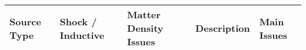 \begin{table}[H]
\begin{footnotesize}
%
%
\centering
\begin{tabular}{|p{.7in}|p{.5in}|p{.5in}|p{1.7in}|p{1.7in}|} \hline

Source Type & Shock / Inductive & Matter Density Issues & Description & Main Issues \\ \hline


\end{tabular}
\end{footnotesize}
\end{table}
